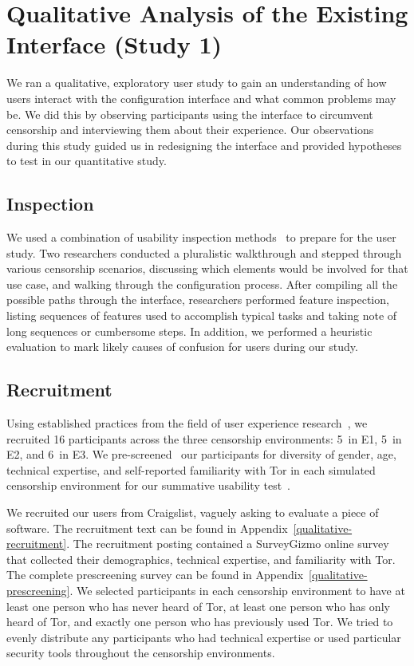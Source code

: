 \documentclass[USenglish,oneside,twocolumn]{article}
\begin{document}
\section{Qualitative Analysis of the Existing Interface (Study 1)}
\label{sec:qualitative}

We ran a qualitative, exploratory user study to gain an 
understanding of how users interact with the configuration interface and
what common problems may be. We did this by observing participants using 
the interface to circumvent censorship and interviewing them about
their experience.  Our observations during this study guided us in
redesigning the interface and provided hypotheses to test in our quantitative study.

\subsection{Inspection}
We used a combination of usability inspection methods~\cite{nielsen1994usability}
to prepare for the user study. Two researchers conducted a pluralistic 
walkthrough and stepped through various censorship
scenarios, discussing which elements would be involved for that use case, and walking 
through the configuration process. After compiling all the possible paths through the 
interface, researchers performed feature inspection, listing sequences of features used 
to accomplish typical tasks and taking note of long sequences or cumbersome
steps. In addition, we performed a heuristic evaluation to mark
likely causes of confusion for users during our study. 

\subsection{Recruitment}
Using established practices from the field of user experience research~\cite{howmanyusers},
we recruited 16 participants across the three censorship environments:
5~in E1, 5~in E2, and 6~in E3.
We pre-screened~\cite{screening} our participants for diversity of gender, age, technical expertise,
and self-reported familiarity with Tor in each simulated censorship environment for our summative
usability test~\cite{summative}. 

We recruited our users from Craigslist, vaguely asking to evaluate a piece of software. 
The recruitment text can be found in Appendix~\ref{qualitative-recruitment}. The recruitment posting contained a 
SurveyGizmo online survey that collected their demographics, technical expertise, and familiarity with Tor.
The complete prescreening survey can be found in Appendix~\ref{qualitative-prescreening}.  
We selected participants in each censorship environment to have at least one person who has never heard of Tor, 
at least one person who has only heard of Tor, and exactly one person who has previously used Tor. We tried to evenly distribute any participants who had technical
expertise or used particular security tools throughout the censorship environments. 
\end{document}
